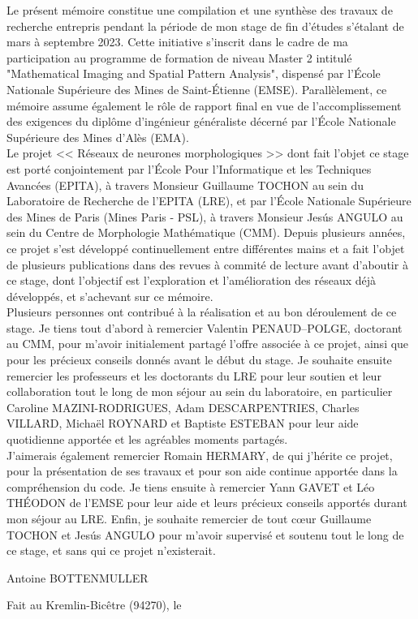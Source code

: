 Le présent mémoire constitue une compilation et une synthèse des travaux de recherche entrepris pendant la période de mon stage de fin d'études s'étalant de mars à septembre 2023. Cette initiative s'inscrit dans le cadre de ma participation au programme de formation de niveau Master 2 intitulé "Mathematical Imaging and Spatial Pattern Analysis", dispensé par l'École Nationale Supérieure des Mines de Saint-Étienne (EMSE). Parallèlement, ce mémoire assume également le rôle de rapport final en vue de l'accomplissement des exigences du diplôme d'ingénieur généraliste décerné par l'École Nationale Supérieure des Mines d'Alès (EMA). \\

\noindent Le projet << Réseaux de neurones morphologiques >> dont fait l'objet ce stage est porté conjointement par l'École Pour l'Informatique et les Techniques Avancées (EPITA), à travers Monsieur Guillaume TOCHON au sein du Laboratoire de Recherche de l'EPITA (LRE), et par l'École Nationale Supérieure des Mines de Paris (Mines Paris - PSL), à travers Monsieur Jesús ANGULO au sein du Centre de Morphologie Mathématique (CMM). Depuis plusieurs années, ce projet s'est développé continuellement entre différentes mains et a fait l'objet de plusieurs publications dans des revues à commité de lecture avant d'aboutir à ce stage, dont l'objectif est l'exploration et l'amélioration des réseaux déjà développés, et s'achevant sur ce mémoire. \\

\noindent Plusieurs personnes ont contribué à la réalisation et au bon déroulement de ce stage. Je tiens tout d'abord à remercier Valentin PENAUD--POLGE, doctorant au CMM, pour m'avoir initialement partagé l'offre associée à ce projet, ainsi que pour les précieux conseils donnés avant le début du stage. Je souhaite ensuite remercier les professeurs et les doctorants du LRE pour leur soutien et leur collaboration tout le long de mon séjour au sein du laboratoire, en particulier Caroline MAZINI-RODRIGUES, Adam DESCARPENTRIES, Charles VILLARD, Michaël ROYNARD et Baptiste ESTEBAN pour leur aide quotidienne apportée et les agréables moments partagés. \\

\noindent J'aimerais également remercier Romain HERMARY, de qui j'hérite ce projet, pour la présentation de ses travaux et pour son aide continue apportée dans la compréhension du code. Je tiens ensuite à remercier Yann GAVET et Léo THÉODON de l'EMSE pour leur aide et leurs précieux conseils apportés durant mon séjour au LRE. Enfin, je souhaite remercier de tout cœur Guillaume TOCHON et Jesús ANGULO pour m'avoir supervisé et soutenu tout le long de ce stage, et sans qui ce projet n'existerait.

\vspace{1.2cm}
\noindent Antoine BOTTENMULLER

\vspace{0.4cm}
\makeatletter
\noindent Fait au Kremlin-Bicêtre (94270), le \@date 
\vfill
\makeatother
